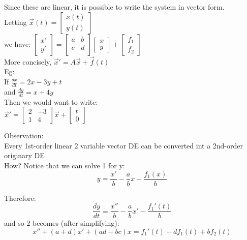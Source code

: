 \documentclass[12pt]{article}
\begin{document}
	Since these are linear, it is possible to write the system in vector form.\\
	Letting $\overrightarrow{x}(t) =
	\begin{bmatrix}
	x(t) \\ y(t)
	\end{bmatrix}$
	\\ we have:
	$\begin{bmatrix}
	x' \\ y'
	\end{bmatrix}
	=
	\begin{bmatrix}
	a & b \\
	c & d \\
	\end{bmatrix}
	\begin{bmatrix}
	x \\ y
	\end{bmatrix}
	+
	\begin{bmatrix}
	f_1 \\ f_2
	\end{bmatrix}
	$\\
	
	More concisely, $\overrightarrow{x}' = A\overrightarrow{x} + \overrightarrow{f}(t)$\\
	
	Eg:\\
	If $\frac{dx}{dt} = 2x - 3y + t$\\
	and $\frac{dy}{dt} = x + 4y$\\
	Then we would want to write:\\
	$\overrightarrow{x}' = 
	\begin{bmatrix}
	2 & -3 \\ 1 & 4
	\end{bmatrix}
	\overrightarrow{x}
	 +
	 \begin{bmatrix}
	 t \\ 0
	 \end{bmatrix}$
	 
	 Observation:\\
	 Every 1st-order linear 2 variable vector DE can be converted int a 2nd-order originary DE\\
	 
	 How? Notice that we can solve 1 for y:\\
	 $$y = \frac{x'}{b} - \frac{a}{b}x - \frac{f_1(x)}{b}$$
	 
	 Therefore:\\
	 $$\frac{dy}{dt} = \frac{x''}{b} - \frac{a}{b}x' - \frac{f_1'(t)}{b}$$
	 and so 2 becomes (after simplifying):\\
	 $$x'' + (a+d)x' + (ad-bc)x = f_1'(t) - df_1(t) + bf_2(t)$$
	 
\end{document}

